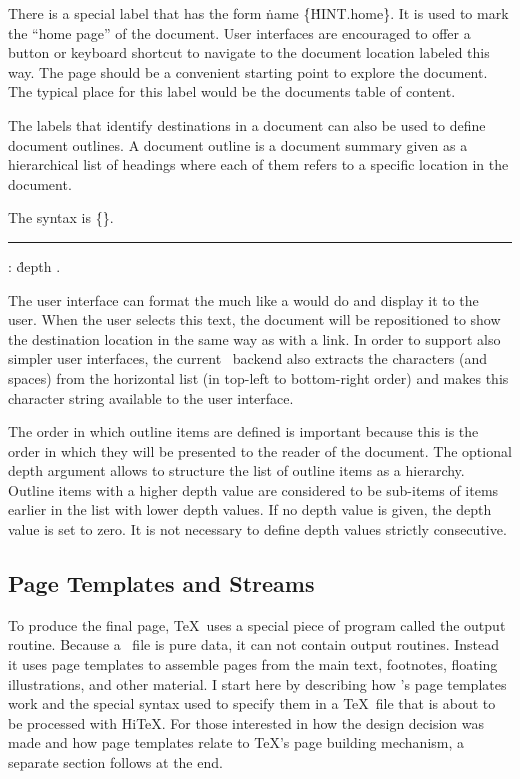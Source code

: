 There is a special label that has the form
\.{name} \.{\{}\.{HINT.home}\.{\}}.
It is used to mark the ``home page'' of the document. User interfaces
are encouraged to offer a button or keyboard shortcut to navigate to the
document location labeled this way. The page should be a convenient
starting point to explore the document. The typical place for this label
would be the documents table of content.

The labels that identify destinations in a document can also be used
to define document outlines. A document outline is a document summary
given as a hierarchical list of headings where each of them
refers to a specific location in the document.

The syntax is
\medskip
\prim{}
  \.{\{}\.{\}}.
\medskip
\rule {}: \.{depth} .
\medskip

The user interface can format the  much like 
a  would do and display it to the user. When the user selects
this text, the document will be repositioned to show the destination location
in the same way as with a link. In order to support also simpler
user interfaces, the current \HINT\ backend also extracts the characters
(and spaces) from the horizontal list (in top-left to bottom-right order)
and makes this character string available to the user interface.


The order in which outline items are defined is important because
this is the order in which they will be presented to the reader of the
document. The optional depth argument allows to structure 
the list of outline items as a hierarchy. Outline items with a higher depth value are considered to be sub-items of items earlier in the list with lower
depth values. If no depth value is given, the depth value is set to zero.
It is not necessary to define depth values strictly consecutive.


\subsection{Page Templates and Streams}

To produce the final page, \TeX\ uses a special piece of program
called the output routine.  Because a \HINT\
file is pure data, it can not contain output routines.  Instead it
uses page templates to assemble pages from the main text, footnotes,
floating illustrations, and other material.  I start here by
describing how \HINT's page templates work and the special syntax used
to specify them in a \TeX\ file that is about to be processed with
Hi\TeX.  For those interested in how the design decision was made and
how page templates relate to \TeX's page building mechanism, a
separate section follows at the end.

